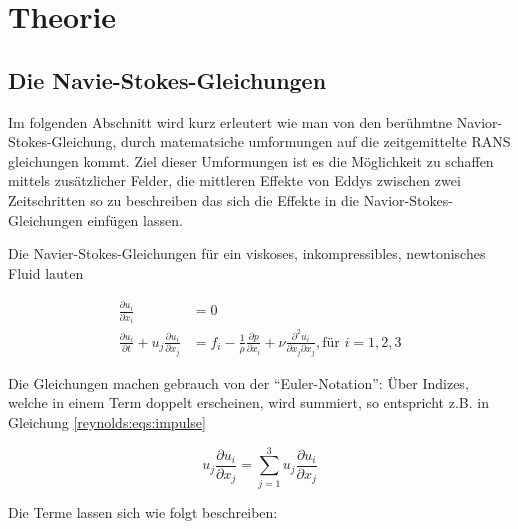%
%
%
%
\section{Theorie\label{reynolds:section:teil0}}
\subsection{Die Navie-Stokes-Gleichungen}

Im folgenden Abschnitt wird kurz erleutert wie man von den berühmtne Navior-Stokes-Gleichung,
durch matematsiche umformungen auf die zeitgemittelte RANS gleichungen kommt.
Ziel dieser Umformungen ist es die Möglichkeit zu schaffen mittels zusätzlicher Felder,
die mittleren Effekte von Eddys zwischen zwei Zeitschritten so zu beschreiben das sich die Effekte in die Navior-Stokes-Gleichungen einfügen lassen.



Die Navier-Stokes-Gleichungen für ein viskoses, inkompressibles, newtonisches Fluid lauten

\begin{align}
    \label{reynolds:eqs:mass}
    \frac{\partial u_i}{\partial x_i} &= 0 \\
    \label{reynolds:eqs:impulse}
    \frac{\partial u_i}{\partial t} + u_j \frac{\partial u_i}{\partial x_j} &=
        f_i - \frac{1}{\rho} \frac{\partial p}{\partial x_i} + 
        \nu \frac{\partial^2 u_i}{\partial x_j \partial x_j}, \text{für $i = 1,2,3$}
\end{align}

Die Gleichungen machen gebrauch von der ``Euler-Notation'': Über Indizes, welche in einem Term doppelt
erscheinen, wird summiert, so entspricht z.B. in Gleichung \ref{reynolds:eqs:impulse}

\begin{equation}
u_j \frac{\partial u_i}{\partial x_j} = \sum_{j=1}^{3} u_j \frac{\partial u_i}{\partial x_j}
\end{equation}

Die Terme lassen sich wie folgt beschreiben:

